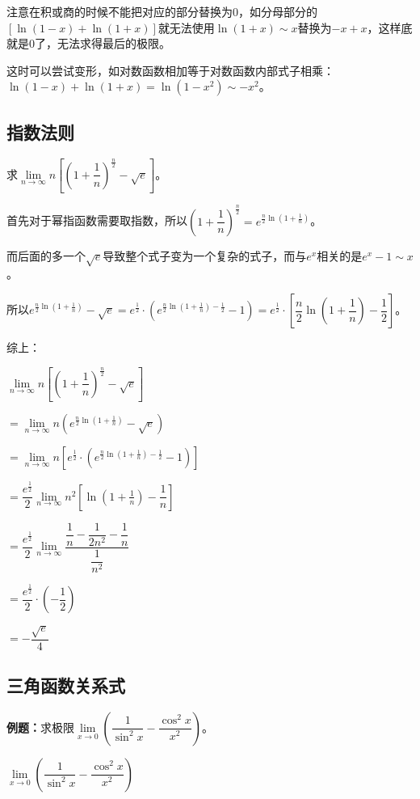 \documentclass[UTF8, 12pt]{ctexart}
\begin{document}
注意在积或商的时候不能把对应的部分替换为0，如分母部分的$[\ln(1-x)+\ln(1+x)]$就无法使用$\ln(1+x)\sim x$替换为$-x+x$，这样底就是0了，无法求得最后的极限。

这时可以尝试变形，如对数函数相加等于对数函数内部式子相乘：$\ln(1-x)+\ln(1+x)=\ln(1-x^2)\sim-x^2$。

\subsection{指数法则}

求$\lim\limits_{n\to\infty}n\left[\left(1+\dfrac{1}{n}\right)^{\frac{n}{2}}-\sqrt{e}\right]$。

首先对于幂指函数需要取指数，所以$\left(1+\dfrac{1}{n}\right)^{\frac{n}{2}}=e^{\frac{n}{2}\ln(1+\frac{1}{n})}$。\medskip

而后面的多一个$\sqrt{e}$导致整个式子变为一个复杂的式子，而与$e^x$相关的是$e^x-1\sim x$。

所以$e^{\frac{n}{2}\ln(1+\frac{1}{n})}-\sqrt{e}=e^{\frac{1}{2}}\cdot\left(e^{\frac{n}{2}\ln(1+\frac{1}{n})-\frac{1}{2}}-1\right)=e^{\frac{1}{2}}\cdot\left[\dfrac{n}{2}\ln(1+\dfrac{1}{n})-\dfrac{1}{2}\right]$。

综上：

$\lim\limits_{n\to\infty}n\left[\left(1+\dfrac{1}{n}\right)^{\frac{n}{2}}-\sqrt{e}\right]$ \medskip

$=\lim\limits_{n\to\infty}n\left(e^{\frac{n}{2}\ln(1+\frac{1}{n})}-\sqrt{e}\right)$ \medskip

$=\lim\limits_{n\to\infty}n\left[e^{\frac{1}{2}}\cdot\left(e^{\frac{n}{2}\ln(1+\frac{1}{n})-\frac{1}{2}}-1\right)\right]$ \medskip

$=\dfrac{e^{\frac{1}{2}}}{2}\lim\limits_{n\to\infty}n^2\left[\ln\left(1+\frac{1}{n}\right)-\dfrac{1}{n}\right]$

$=\dfrac{e^{\frac{1}{2}}}{2}\lim\limits_{n\to\infty}\dfrac{\dfrac{1}{n}-\dfrac{1}{2n^2}-\dfrac{1}{n}}{\dfrac{1}{n^2}}$

$=\dfrac{e^{\frac{1}{2}}}{2}\cdot\left(-\dfrac{1}{2}\right)$

$=-\dfrac{\sqrt{e}}{4}$

\subsection{三角函数关系式}

\textbf{例题：}求极限$\lim\limits_{x\to 0}\left(\dfrac{1}{\sin^2x}-\dfrac{\cos^2x}{x^2}\right)$。\medskip

$\lim\limits_{x\to 0}\left(\dfrac{1}{\sin^2x}-\dfrac{\cos^2x}{x^2}\right)$ \medskip
\end{document}
